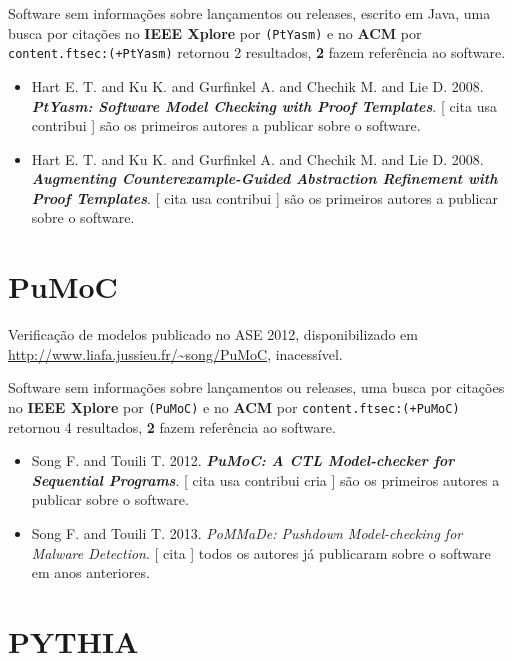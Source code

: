 Software sem informações sobre lançamentos ou releases,
escrito em Java,
uma busca por citações no {\bf IEEE Xplore} por
\texttt{(PtYasm)}
e no {\bf ACM} por
\texttt{content.ftsec:(+PtYasm)}
retornou
2 resultados,
{\bf 2} fazem referência ao software.

\begin{itemize}
\item Hart E. T. and Ku K. and Gurfinkel A. and Chechik M. and Lie D.
      2008.
        \textbf{\textit{ PtYasm: Software Model Checking with Proof Templates}}.
      [
          cita
          usa
          contribui
      ]
são os primeiros autores a publicar sobre o software.
\item Hart E. T. and Ku K. and Gurfinkel A. and Chechik M. and Lie D.
      2008.
        \textbf{\textit{ Augmenting Counterexample-Guided Abstraction Refinement with Proof Templates}}.
      [
          cita
          usa
          contribui
      ]
são os primeiros autores a publicar sobre o software.
\end{itemize}
\section{PuMoC}

Verificação de modelos
publicado no ASE 2012,
disponibilizado em \url{http://www.liafa.jussieu.fr/~song/PuMoC},
inacessível.

Software sem informações sobre lançamentos ou releases,
uma busca por citações no {\bf IEEE Xplore} por
\texttt{(PuMoC)}
e no {\bf ACM} por
\texttt{content.ftsec:(+PuMoC)}
retornou
4 resultados,
{\bf 2} fazem referência ao software.

\begin{itemize}
\item Song F. and Touili T.
      2012.
        \textbf{\textit{ PuMoC: A CTL Model-checker for Sequential Programs}}.
      [
          cita
          usa
          contribui
          cria
      ]
são os primeiros autores a publicar sobre o software.
\item Song F. and Touili T.
      2013.
        \textit{ PoMMaDe: Pushdown Model-checking for Malware Detection}.
      [
          cita
      ]
todos os autores já publicaram sobre o software em anos anteriores.
\end{itemize}
\section{PYTHIA}

